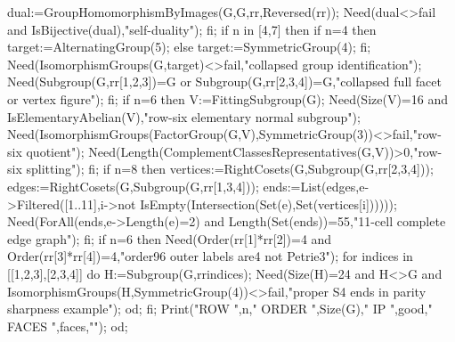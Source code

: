 \documentclass[11pt,a4paper]{article}
\begin{document}
\begin{CompleteProgram}
    dual:=GroupHomomorphismByImages(G,G,rr,Reversed(rr));
    Need(dual<>fail and IsBijective(dual),"self-duality");
  fi;
  if n in [4,7] then
    if n=4 then target:=AlternatingGroup(5); else target:=SymmetricGroup(4); fi;
    Need(IsomorphismGroups(G,target)<>fail,"collapsed group identification");
    Need(Subgroup(G,rr{[1,2,3]})=G or Subgroup(G,rr{[2,3,4]})=G,"collapsed full facet or vertex figure");
  fi;
  if n=6 then
    V:=FittingSubgroup(G); Need(Size(V)=16 and IsElementaryAbelian(V),"row-six elementary normal subgroup");
    Need(IsomorphismGroups(FactorGroup(G,V),SymmetricGroup(3))<>fail,"row-six quotient");
    Need(Length(ComplementClassesRepresentatives(G,V))>0,"row-six splitting");
  fi;
  if n=8 then
    vertices:=RightCosets(G,Subgroup(G,rr{[2,3,4]}));
    edges:=RightCosets(G,Subgroup(G,rr{[1,3,4]}));
    ends:=List(edges,e->Filtered([1..11],i->not IsEmpty(Intersection(Set(e),Set(vertices[i])))));
    Need(ForAll(ends,e->Length(e)=2) and Length(Set(ends))=55,"11-cell complete edge graph");
  fi;
  if n=6 then
    Need(Order(rr[1]*rr[2])=4 and Order(rr[3]*rr[4])=4,"order96 outer labels are4 not Petrie3");
    for indices in [[1,2,3],[2,3,4]] do
      H:=Subgroup(G,rr{indices});
      Need(Size(H)=24 and H<>G and IsomorphismGroups(H,SymmetricGroup(4))<>fail,"proper S4 ends in parity sharpness example");
    od;
  fi;
  Print("ROW ",n," ORDER ",Size(G)," IP ",good," FACES ",faces,"\n");
od;


\end{CompleteProgram}
\end{document}
